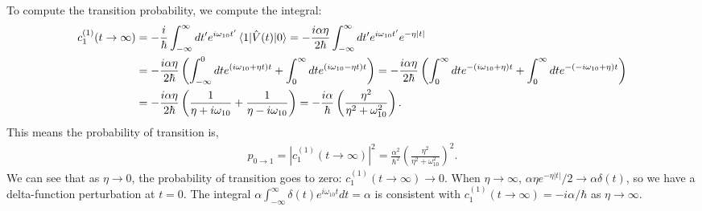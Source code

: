 \documentclass[10pt]{article}
\newcommand{\1}{\mathbf 1}
\begin{document}
To compute the transition probability, we compute the integral:
\begin{align}
	c_{1}^{(1)}(t \to \infty)
	&=\nonumber
	-\frac{i}{\hbar}
	\int_{-\infty}^\infty
	dt'
	e^{i \omega_{10} t'}
	\braket{1 | \hat V(t) | 0}
	=
	-\frac{i\alpha\eta}{2\hbar}
	\int_{-\infty}^\infty
	dt'
	e^{i \omega_{10} t'}
	e^{-\eta |t|}
	\\
	&
	=
	-
	\frac{i\alpha\eta}{2\hbar}
	\left(
		\int_{-\infty}^0 dt e^{(i \omega_{10} + \eta t)t}
		+
		\int_{0}^{\infty} dt e^{(i \omega_{10} - \eta t)t}
	\right)
	=
	-
	\frac{i\alpha\eta}{2\hbar}
	\left(
		\int_{0}^\infty dt e^{-(i \omega_{10} + \eta )t}
		+
		\int_{0}^{\infty} dt e^{-(-i \omega_{10} + \eta )t}
	\right)
	\nonumber
	\\
	&
	=
	-
	\frac{i\alpha\eta}{2\hbar}
	\left(
		\frac{1}{\eta + i \omega_{10}}
		+
		\frac{1}{\eta - i \omega_{10}}
	\right)
	=
	-
	\frac{i\alpha}{\hbar}
	\left(
		\frac{\eta^2}{\eta^2 + \omega_{10}^2}
	\right).
\end{align}
This means the probability of transition is,
\begin{align}
	p_{0 \to 1}
	=
	|c_1^{(1)}(t \to \infty)|^2
	=
	\frac{\alpha^2}{\hbar^2}
	\left(
		\frac{\eta^2}{\eta^2 + \omega_{10}^2}
	\right)^2.
\end{align}
We can see that as $\eta \to 0$, the probability of transition goes to zero: $c_1^{(1)} (t \to \infty)\to 0$.
When $\eta \to \infty$, $\alpha \eta e^{-\eta|t|}/2 \to \alpha \delta(t)$, so we have a delta-function perturbation at $t=0$.
The integral $\alpha\int_{-\infty}^\infty \delta(t) e^{i \omega_{10}t} dt = \alpha$ is consistent with $c_1^{(1)} (t \to \infty) = -i\alpha/\hbar$ as $\eta \to \infty$.



\end{document}
